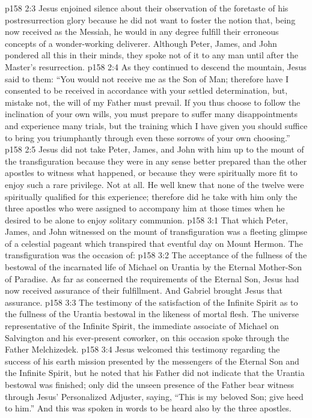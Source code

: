 \vs p158 2:3 Jesus enjoined silence about their observation of the foretaste of his postresurrection glory because he did not want to foster the notion that, being now received as the Messiah, he would in any degree fulfill their erroneous concepts of a wonder\hyp{}working deliverer. Although Peter, James, and John pondered all this in their minds, they spoke not of it to any man until after the Master’s resurrection.
\vs p158 2:4 As they continued to descend the mountain, Jesus said to them: \textcolor{ubdarkred}{“You would not receive me as the Son of Man; therefore have I consented to be received in accordance with your settled determination, but, mistake not, the will of my Father must prevail. If you thus choose to follow the inclination of your own wills, you must prepare to suffer many disappointments and experience many trials, but the training which I have given you should suffice to bring you triumphantly through even these sorrows of your own choosing.”}
\vs p158 2:5 Jesus did not take Peter, James, and John with him up to the mount of the transfiguration because they were in any sense better prepared than the other apostles to witness what happened, or because they were spiritually more fit to enjoy such a rare privilege. Not at all. He well knew that none of the twelve were spiritually qualified for this experience; therefore did he take with him only the three apostles who were assigned to accompany him at those times when he desired to be alone to enjoy solitary communion.\plusone
{}
\vs p158 3:1 That which Peter, James, and John witnessed on the mount of transfiguration was a fleeting glimpse of a celestial pageant which transpired that eventful day on Mount Hermon. The transfiguration was the occasion of:
\pc \vs p158 3:2 \bibnobreakspace The acceptance of the fullness of the bestowal of the incarnated life of Michael on Urantia by the Eternal Mother\hyp{}Son of Paradise. As far as concerned the requirements of the Eternal Son, Jesus had now received assurance of their fulfillment. And Gabriel brought Jesus that assurance.
\pc \vs p158 3:3 \bibnobreakspace The testimony of the satisfaction of the Infinite Spirit as to the fullness of the Urantia bestowal in the likeness of mortal flesh. The universe representative of the Infinite Spirit, the immediate associate of Michael on Salvington and his ever\hyp{}present coworker, on this occasion spoke through the Father Melchizedek.
\pc \vs p158 3:4 Jesus welcomed this testimony regarding the success of his earth mission presented by the messengers of the Eternal Son and the Infinite Spirit, but he noted that his Father did not indicate that the Urantia bestowal was finished; only did the unseen presence of the Father bear witness through Jesus’ Personalized Adjuster, saying, “This is my beloved Son; give heed to him.” And this was spoken in words to be heard also by the three apostles.
